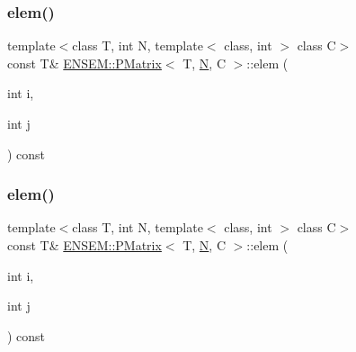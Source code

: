 \mbox{\label{classENSEM_1_1PMatrix_a5cacb33b2dcd4c33a9d3a135528a8bdf}} 
\subsubsection{\texorpdfstring{elem()}{elem()}\hspace{0.1cm}{\footnotesize\ttfamily [3/4]}}
{\footnotesize\ttfamily template$<$class T, int N, template$<$ class, int $>$ class C$>$ \\
const T\& \mbox{\hyperlink{classENSEM_1_1PMatrix}{E\+N\+S\+E\+M\+::\+P\+Matrix}}$<$ T, \mbox{\hyperlink{operator__name__util_8cc_a7722c8ecbb62d99aee7ce68b1752f337}{N}}, C $>$\+::elem (\begin{DoxyParamCaption}\item[{int}]{i,  }\item[{int}]{j }\end{DoxyParamCaption}) const\hspace{0.3cm}{\ttfamily [inline]}}

\mbox{\label{classENSEM_1_1PMatrix_a5cacb33b2dcd4c33a9d3a135528a8bdf}} 
\subsubsection{\texorpdfstring{elem()}{elem()}\hspace{0.1cm}{\footnotesize\ttfamily [4/4]}}
{\footnotesize\ttfamily template$<$class T, int N, template$<$ class, int $>$ class C$>$ \\
const T\& \mbox{\hyperlink{classENSEM_1_1PMatrix}{E\+N\+S\+E\+M\+::\+P\+Matrix}}$<$ T, \mbox{\hyperlink{operator__name__util_8cc_a7722c8ecbb62d99aee7ce68b1752f337}{N}}, C $>$\+::elem (\begin{DoxyParamCaption}\item[{int}]{i,  }\item[{int}]{j }\end{DoxyParamCaption}) const\hspace{0.3cm}{\ttfamily [inline]}}

\mbox{\label{classENSEM_1_1PMatrix_a4c25aeda146eb61d41abf6cf625a6153}} 
